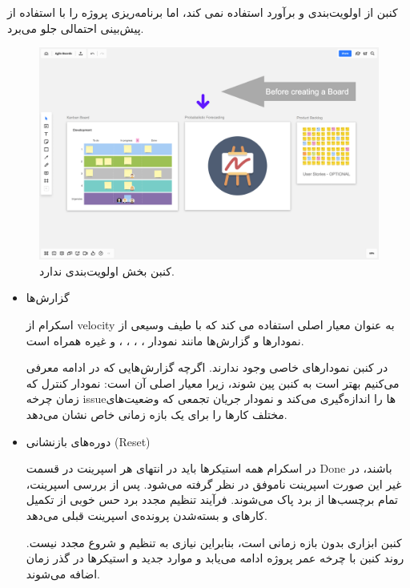 {کنبن از اولویت‌بندی و برآورد استفاده نمی کند، اما برنامه‌ریزی پروژه را با استفاده از پیش‌بینی احتمالی جلو می‌برد.

\begin{figure}
	\centering
	\includegraphics[scale=0.3]{figs/4-2-d}
	\caption{کنبن بخش اولویت‌بندی ندارد.}
\end{figure}

\begin{itemize}

\item گزارش‌ها

اسکرام از velocity به عنوان معیار اصلی استفاده می کند که با طیف وسیعی از نمودارها و گزارش‌ها مانند
نمودار ، ، ، ،  و غیره همراه است.

در کنبن نمودارهای خاصی وجود ندارند. اگرچه گزارش‌هایی که در ادامه معرفی می‌کنیم بهتر است به کنبن پین شوند، زیرا معیار اصلی آن  است: نمودار کنترل که زمان چرخه issueها را اندازه‌گیری می‌کند و نمودار جریان تجمعی که وضعیت‌های مختلف کارها را برای یک بازه زمانی خاص نشان می‌دهد.

\item دوره‌های بازنشانی (Reset)

در اسکرام همه استیکرها باید در انتهای هر اسپرینت در قسمت Done باشند، در غیر این صورت اسپرینت ناموفق در نظر گرفته می‌شود. پس از بررسی اسپرینت، تمام برچسب‌ها از برد پاک می‌شوند. فرآیند تنظیم مجدد برد حس خوبی از تکمیل کارهای و بسته‌شدن پرونده‌ی اسپرینت قبلی می‌دهد.

کنبن ابزاری بدون بازه زمانی است، بنابراین نیازی به تنظیم و شروع مجدد نیست. روند کنبن با چرخه عمر پروژه ادامه می‌یابد و موارد جدید و استیکرها در گذر زمان اضافه می‌شوند.

\end{itemize}

}

